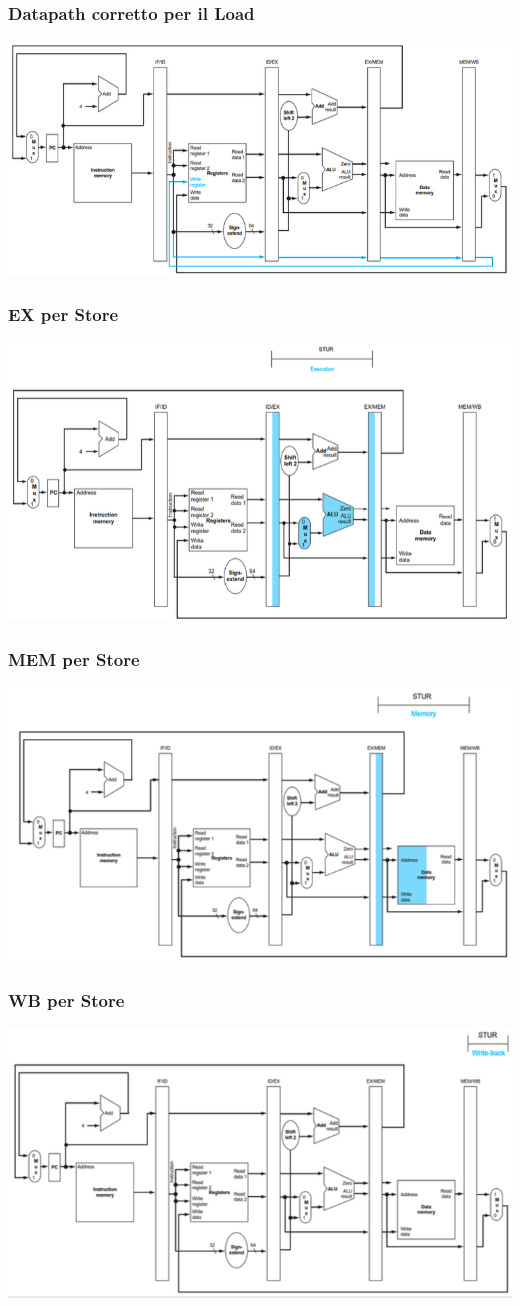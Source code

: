 \documentclass[12pt,a4paper]{article}
\begin{document}
\subsubsection{Datapath corretto per il Load}
\begin{center}
\includegraphics[width=0.6\columnwidth]{img/load_correct.png}
\end{center}

\subsubsection{EX per Store}
\begin{center}
\includegraphics[width=0.6\columnwidth]{img/pipeline_ex_store.png}
\end{center}

\subsubsection{MEM per Store}
\begin{center}
\includegraphics[width=0.6\columnwidth]{img/pipeline_mem_store.png}
\end{center}

\subsubsection{WB per Store}
\begin{center}
\includegraphics[width=0.6\columnwidth]{img/pipeline_wb_store.png}
\end{center}
\end{document}
